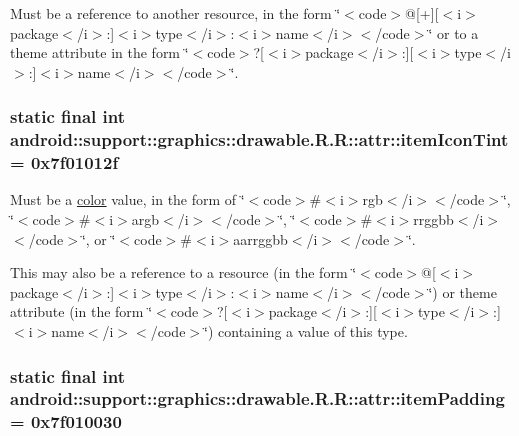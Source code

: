 Must be a reference to another resource, in the form \char`\"{}$<$code$>$@\mbox{[}+\mbox{]}\mbox{[}$<$i$>$package$<$/i$>$:\mbox{]}$<$i$>$type$<$/i$>$:$<$i$>$name$<$/i$>$$<$/code$>$\char`\"{} or to a theme attribute in the form \char`\"{}$<$code$>$?\mbox{[}$<$i$>$package$<$/i$>$:\mbox{]}\mbox{[}$<$i$>$type$<$/i$>$:\mbox{]}$<$i$>$name$<$/i$>$$<$/code$>$\char`\"{}. \hypertarget{classandroid_1_1support_1_1graphics_1_1drawable_1_1_r_1_1attr_84306507d408808fecae60362581b1e5}{
\subsubsection[{itemIconTint}]{\setlength{\rightskip}{0pt plus 5cm}static final int android::support::graphics::drawable.R.R::attr::itemIconTint = 0x7f01012f}}
\label{classandroid_1_1support_1_1graphics_1_1drawable_1_1_r_1_1attr_84306507d408808fecae60362581b1e5}


Must be a \hyperlink{classandroid_1_1support_1_1graphics_1_1drawable_1_1_r_1_1color}{color} value, in the form of \char`\"{}$<$code$>$\#$<$i$>$rgb$<$/i$>$$<$/code$>$\char`\"{}, \char`\"{}$<$code$>$\#$<$i$>$argb$<$/i$>$$<$/code$>$\char`\"{}, \char`\"{}$<$code$>$\#$<$i$>$rrggbb$<$/i$>$$<$/code$>$\char`\"{}, or \char`\"{}$<$code$>$\#$<$i$>$aarrggbb$<$/i$>$$<$/code$>$\char`\"{}. 

This may also be a reference to a resource (in the form \char`\"{}$<$code$>$@\mbox{[}$<$i$>$package$<$/i$>$:\mbox{]}$<$i$>$type$<$/i$>$:$<$i$>$name$<$/i$>$$<$/code$>$\char`\"{}) or theme attribute (in the form \char`\"{}$<$code$>$?\mbox{[}$<$i$>$package$<$/i$>$:\mbox{]}\mbox{[}$<$i$>$type$<$/i$>$:\mbox{]}$<$i$>$name$<$/i$>$$<$/code$>$\char`\"{}) containing a value of this type. \hypertarget{classandroid_1_1support_1_1graphics_1_1drawable_1_1_r_1_1attr_d1302b9e6807f4a537fc3a0a7736f9dd}{
\subsubsection[{itemPadding}]{\setlength{\rightskip}{0pt plus 5cm}static final int android::support::graphics::drawable.R.R::attr::itemPadding = 0x7f010030}}
\label{classandroid_1_1support_1_1graphics_1_1drawable_1_1_r_1_1attr_d1302b9e6807f4a537fc3a0a7736f9dd}


